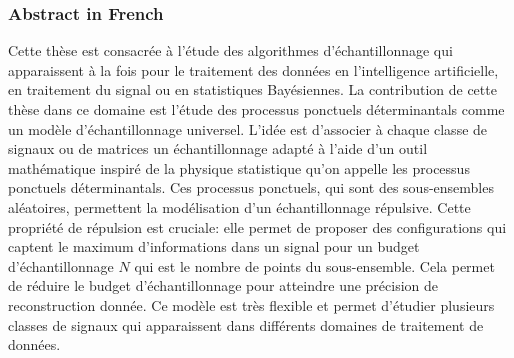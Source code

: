 \documentclass[twoside,11pt]{book}
\numberwithin{theorem}{chapter}
\numberwithin{definition}{chapter}
\numberwithin{proposition}{chapter}
\numberwithin{corollary}{chapter}
\numberwithin{example}{chapter}
\numberwithin{lemma}{chapter}
\numberwithin{assumption}{chapter}
\numberwithin{equation}{chapter}
\numberwithin{figure}{chapter}
\begin{document}
\subsubsection{Abstract in French}
Cette thèse est consacrée à l'étude des algorithmes d'échantillonnage qui apparaissent à la fois pour le traitement des données en l'intelligence artificielle, en traitement du signal ou en statistiques Bayésiennes. La contribution de cette thèse dans ce domaine est l'étude des processus ponctuels déterminantals comme un modèle d'échantillonnage universel. L'idée est d'associer à chaque classe de signaux ou de matrices un échantillonnage adapté à l'aide d'un outil mathématique inspiré de la physique statistique qu'on appelle les processus ponctuels déterminantals. Ces processus ponctuels, qui sont des sous-ensembles aléatoires, permettent la modélisation d'un échantillonnage répulsive. Cette propriété de répulsion est cruciale: elle permet de proposer des configurations qui captent le maximum d'informations dans un signal pour un budget d'échantillonnage $N$ qui est le nombre de points du sous-ensemble. Cela permet de réduire le budget d'échantillonnage pour atteindre une précision de reconstruction donnée. Ce modèle est très flexible et permet d'étudier plusieurs classes de signaux qui apparaissent dans différents domaines de traitement de données.





\clearpage






\end{document}
